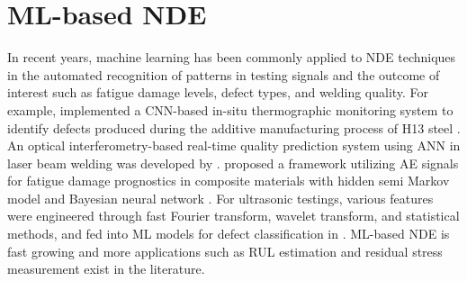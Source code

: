 \section{ML-based NDE}
In recent years, machine learning has been commonly applied to NDE techniques in the automated recognition of patterns in testing signals and the outcome of interest such as fatigue damage levels, defect types, and welding quality. For example,  implemented a CNN-based in-situ thermographic monitoring system to identify defects produced during the additive manufacturing process of H13 steel \cite{nde-ml-thermography-defect-Baumgartl2020}. An optical interferometry-based real-time quality prediction system using ANN in laser beam welding was developed by  \cite{nde-ml-interferometry-quality-Stad2020}.  proposed a framework utilizing AE signals for fatigue damage prognostics in composite materials with hidden semi Markov model and Bayesian neural network \cite{nde-ml-ae-fatigue-LOUTAS2017522}. For ultrasonic testings, various features were engineered through fast Fourier transform, wavelet transform, and statistical methods, and fed into ML models for defect classification in \cite{nde-lu-ml-defect-Sambath2011,nde-lu-ml-defect-s19194216}. ML-based NDE is fast growing and more applications such as RUL estimation and residual stress measurement exist in the literature.

